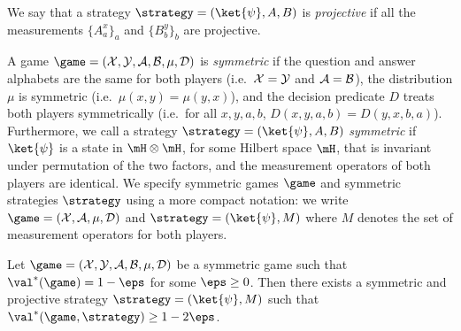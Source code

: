 \begin{definition}
\hypertarget{000B}{}
\reversemarginpar{}
  \label{def:projective-strategy}
  We say that a strategy $\strategy = (\ket{\psi}, A, B)$ is \emph{projective} if
  all the measurements $\{A^x_a\}_a$ and $\{B^y_b\}_b$ are projective.
\end{definition}

\begin{remark}
\hypertarget{000C}{}
\reversemarginpar{}
  \label{rem:symmetric-games}
	A game $\game = (\cal{X}, \cal{Y}, \cal{A}, \cal{B}, \mu, D)$ is
  \emph{symmetric} if the question and answer alphabets are the same for both
  players (i.e.\
  $\cal{X} = \cal{Y}$ and $\cal{A} = \cal{B}$), the distribution $\mu$ is
  symmetric (i.e.\
  $\mu(x,y) = \mu(y,x)$), and the decision predicate $D$ treats both players
  symmetrically (i.e.\ for all $x,y,a,b$, $D(x,y,a,b) = D(y,x,b,a)$).
  Furthermore, we call a strategy $\strategy = (\ket{\psi}, A, B)$
  \emph{symmetric} if $\ket{\psi}$ is a state in $\mH \otimes \mH$, for some
  Hilbert space $\mH$, that is invariant under permutation of the two factors,
  and the measurement operators of both players are identical.
  We specify symmetric games $\game$ and symmetric strategies $\strategy$ using
  a more compact notation: we write $\game = (\cal{X}, \cal{A}, \mu, D)$ and
  $\strategy = (\ket{\psi}, M)$ where $M$ denotes the set of measurement
  operators for both players.
\end{remark}

\begin{lemma}
\hypertarget{000D}{}
\reversemarginpar{}
  \label{lem:symmetric-strat}
  Let $\game = (\cal{X}, \cal{Y}, \cal{A}, \cal{B}, \mu, D)$ be a symmetric game
  such that $\val^*(\game) = 1-\eps$ for some $\eps\geq 0$.
  Then there exists a symmetric and projective strategy
  $\strategy=(\ket{\psi},M)$ such that $\val^*(\game,\strategy)\geq 1-2\eps$.
\end{lemma}

